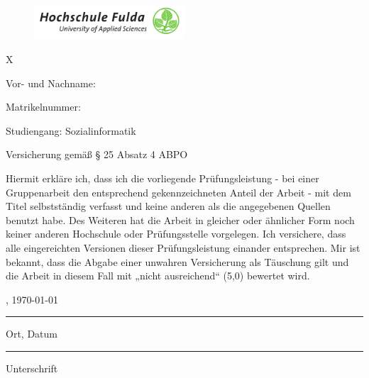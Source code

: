 
\thispagestyle{empty}

\begin{figure}
  \centering
  \includegraphics[width=0.5\textwidth]{res/hs_fulda_logo_ntr.jpg}
\end{figure}

{\color{white} X} %

\vspace{2cm}

Vor- und Nachname: \vorname \nachname

Matrikelnummer: \matrikelnummer

Studiengang: Sozialinformatik

\vspace{1cm}

{\centering\Large Versicherung gemäß § 25 Absatz 4 ABPO \par}


\vspace{0.5cm}
    
Hiermit erkläre ich, dass ich die vorliegende Prüfungsleistung - bei einer Gruppenarbeit den
entsprechend gekennzeichneten Anteil der Arbeit - mit dem
Titel \textbf{\dqs{\titel}}
selbstständig verfasst und keine anderen als die angegebenen Quellen benutzt habe.
Des Weiteren hat die Arbeit in gleicher oder ähnlicher Form noch keiner anderen Hochschule oder
Prüfungsstelle vorgelegen. Ich versichere, dass alle eingereichten Versionen dieser Prüfungsleistung
einander entsprechen.
Mir ist bekannt, dass die Abgabe einer unwahren Versicherung als Täuschung gilt und die Arbeit in
diesem Fall mit „nicht ausreichend“ (5,0) bewertet wird.


\vspace{3cm}

\parbox{6cm}{\centering  \ortderarbeit, \today\hrule\strut\centering\footnotesize Ort, Datum}
\hfill
\vspace{-2cm}
\parbox{6cm}{ \hrule\strut \centering\footnotesize Unterschrift}



